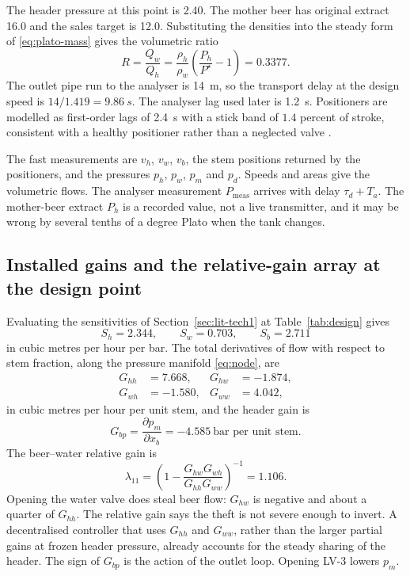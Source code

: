 The header pressure at this point is \SI{2.40}{\barg}. The mother beer has original extract \SI{16.0}{\plato} and the sales target is \SI{12.0}{\plato}. Substituting the densities into the steady form of \eqref{eq:plato-mass} gives the volumetric ratio
\begin{equation}
\label{eq:R0}
R = \frac{Q_w}{Q_h} = \frac{\rho_h}{\rho_w}\left(\frac{P_h}{P^\star}-1\right) = 0.3377.
\end{equation}
The outlet pipe run to the analyser is \SI{14}{m}, so the transport delay at the design speed is $14/1.419 = \SI{9.86}{s}$. The analyser lag used later is \SI{1.2}{s}. Positioners are modelled as first-order lags of \SI{2.4}{s} with a stick band of $1.4$ percent of stroke, consistent with a healthy positioner rather than a neglected valve \cite{choudhury2005modelling,fisher2005valve}.

The fast measurements are $v_h$, $v_w$, $v_b$, the stem positions returned by the positioners, and the pressures $p_h$, $p_w$, $p_m$ and $p_d$. Speeds and areas give the volumetric flows. The analyser measurement $P_{\mathrm{meas}}$ arrives with delay $\tau_d+T_a$. The mother-beer extract $P_h$ is a recorded value, not a live transmitter, and it may be wrong by several tenths of a degree Plato when the tank changes.

\subsection{Installed gains and the relative-gain array at the design point}

Evaluating the sensitivities of Section~\ref{sec:lit-tech1} at Table~\ref{tab:design} gives
\begin{equation}
S_h = 2.344,\qquad S_w = 0.703,\qquad S_b = 2.711
\end{equation}
in cubic metres per hour per bar. The total derivatives of flow with respect to stem fraction, along the pressure manifold \eqref{eq:node}, are
\begin{equation}
\label{eq:Gdesign}
\begin{aligned}
G_{hh} &= 7.668, & G_{hw} &= -1.874,\\
G_{wh} &= -1.580, & G_{ww} &= 4.042,
\end{aligned}
\end{equation}
in cubic metres per hour per unit stem, and the header gain is
\begin{equation}
G_{bp} = \frac{\partial p_m}{\partial x_b} = -4.585\ \text{bar per unit stem}.
\end{equation}
The beer--water relative gain is
\begin{equation}
\lambda_{11} = \left(1 - \frac{G_{hw}G_{wh}}{G_{hh}G_{ww}}\right)^{-1} = 1.106.
\end{equation}
Opening the water valve does steal beer flow: $G_{hw}$ is negative and about a quarter of $G_{hh}$. The relative gain says the theft is not severe enough to invert. A decentralised controller that uses $G_{hh}$ and $G_{ww}$, rather than the larger partial gains at frozen header pressure, already accounts for the steady sharing of the header. The sign of $G_{bp}$ is the action of the outlet loop. Opening LV-3 lowers $p_m$.

